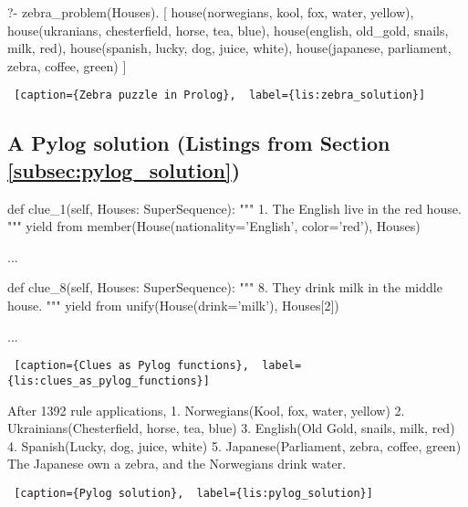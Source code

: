 \noindent
\begin{minipage}{\linewidth}
\begin{python}
?- zebra_problem(Houses).
[    
    house(norwegians, kool, fox, water, yellow), 
    house(ukranians, chesterfield, horse, tea, blue), 
    house(english, old_gold, snails, milk, red), 
    house(spanish, lucky, dog, juice, white), 
    house(japanese, parliament, zebra, coffee, green)     
]
\end{python}
\begin{lstlisting} [caption={Zebra puzzle in Prolog},  label={lis:zebra_solution}]
\end{lstlisting}
\end{minipage}

\subsection{A Pylog solution (Listings from Section \ref{subsec:pylog_solution})} \label{appsubsec:pylog_solution}

\begin{minipage}{\linewidth}
\hrulefill
\begin{python}
  def clue_1(self, Houses: SuperSequence):
    """ 1. The English live in the red house.  """
    yield from member(House(nationality='English', color='red'), Houses)

  ...

  def clue_8(self, Houses: SuperSequence):
    """ 8. They drink milk in the middle house. """
    yield from unify(House(drink='milk'), Houses[2])

  ...
\end{python}
\begin{lstlisting} [caption={Clues as Pylog functions},  label={lis:clues_as_pylog_functions}]
\end{lstlisting}
\end{minipage}

\noindent
\begin{minipage}{\linewidth} \largev
\begin{python}
After 1392 rule applications, 
	1. Norwegians(Kool, fox, water, yellow)
	2. Ukrainians(Chesterfield, horse, tea, blue)
	3. English(Old Gold, snails, milk, red)
	4. Spanish(Lucky, dog, juice, white)
	5. Japanese(Parliament, zebra, coffee, green)
The Japanese own a zebra, and the Norwegians drink water.
\end{python}
\begin{lstlisting} [caption={Pylog solution},  label={lis:pylog_solution}]
\end{lstlisting}
\end{minipage}


